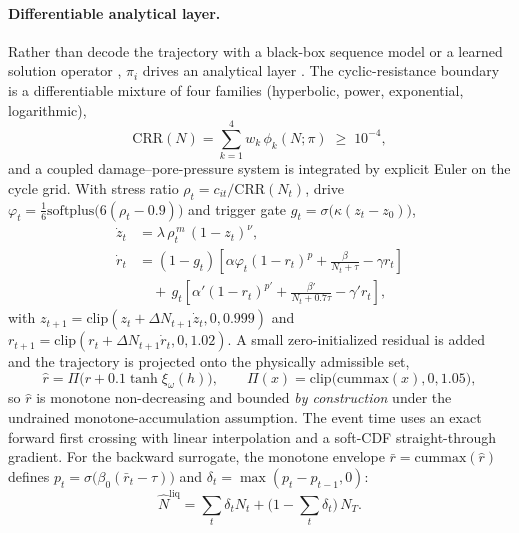 \documentclass[letterpaper]{article} %
\begin{document}
\paragraph{Differentiable analytical layer.} Rather than decode the trajectory with a black-box sequence
model or a learned solution operator \citep{deeponet21,chen18}, $\pi_i$ drives an analytical layer
\citep{seedmartin76,cetinbilge12}. The cyclic-resistance boundary is a differentiable mixture of four
families (hyperbolic, power, exponential, logarithmic),
\begin{equation}
\mathrm{CRR}(N)=\textstyle\sum_{k=1}^{4} w_k\,\phi_k(N;\pi)\;\ge\;10^{-4},
\end{equation}
and a coupled damage--pore-pressure system is integrated by explicit Euler on the cycle grid. With stress
ratio $\rho_t=c_{it}/\mathrm{CRR}(N_t)$, drive $\varphi_t=\tfrac{1}{6}\mathrm{softplus}\!\big(6(\rho_t-0.9)\big)$
and trigger gate $g_t=\sigma\!\big(\kappa(z_t-z_0)\big)$,
\begin{align}
\dot z_t &= \lambda\,\rho_t^{\,m}\,(1-z_t)^{\nu},\\
\dot r_t &= (1-g_t)\!\left[\alpha\varphi_t(1-r_t)^{p}+\tfrac{\beta}{N_t+\tau}-\gamma r_t\right]\nonumber\\
         &\quad +\,g_t\!\left[\alpha'(1-r_t)^{p'}+\tfrac{\beta'}{N_t+0.7\tau}-\gamma' r_t\right],
\end{align}
with $z_{t+1}=\mathrm{clip}(z_t+\Delta N_{t+1}\dot z_t,0,0.999)$ and
$r_{t+1}=\mathrm{clip}(r_t+\Delta N_{t+1}\dot r_t,0,1.02)$. A small zero-initialized residual is added and
the trajectory is projected onto the physically admissible set,
\begin{equation}
\hat{r}=\Pi\!\big(r+0.1\tanh \xi_\omega(h)\big),\qquad
\Pi(x)=\mathrm{clip}\big(\mathrm{cummax}(x),0,1.05\big),
\label{eq:proj}
\end{equation}
so $\hat r$ is monotone non-decreasing and bounded \emph{by construction} under the undrained
monotone-accumulation assumption. The event time uses an exact forward first crossing with linear
interpolation and a soft-CDF straight-through gradient. For the backward surrogate, the monotone
envelope $\bar r=\mathrm{cummax}(\hat r)$ defines $p_t=\sigma\!\big(\beta_0(\bar r_t-\tau)\big)$ and
$\delta_t=\max(p_t-p_{t-1},0)$:
\begin{equation}
\widehat{N}^{\mathrm{liq}}=\textstyle\sum_t \delta_t N_t+\big(1-\sum_t\delta_t\big)\,N_T .
\end{equation}
\end{document}
